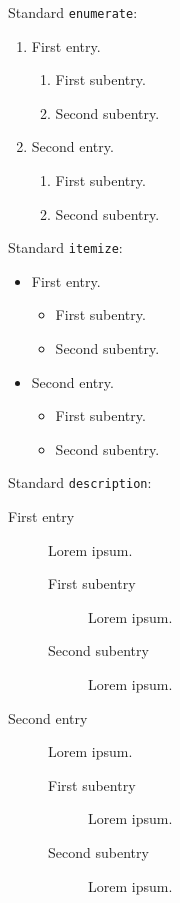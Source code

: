\noindent
Standard \texttt{enumerate}:
\begin{enumerate}
  \item
    First entry.
    \begin{enumerate}
      \item
        First subentry.
      \item
        Second subentry.
    \end{enumerate}
  \item
    Second entry.
    \begin{enumerate}
      \item
        First subentry.
      \item
        Second subentry.
    \end{enumerate}
\end{enumerate}
Standard \texttt{itemize}:
\begin{itemize}
  \item
    First entry.
    \begin{itemize}
      \item
        First subentry.
      \item
        Second subentry.
      \end{itemize}
  \item
    Second entry.
    \begin{itemize}
      \item
        First subentry.
      \item
        Second subentry.
    \end{itemize}
\end{itemize}
Standard \texttt{description}:
\begin{description}
  \item[First entry]
    Lorem ipsum.
    \begin{description}
      \item[First subentry]
        Lorem ipsum.
      \item[Second subentry]
        Lorem ipsum.
    \end{description}
  \item[Second entry]
    Lorem ipsum.
    \begin{description}
      \item[First subentry]
        Lorem ipsum.
      \item[Second subentry]
        Lorem ipsum.
    \end{description}
\end{description}

